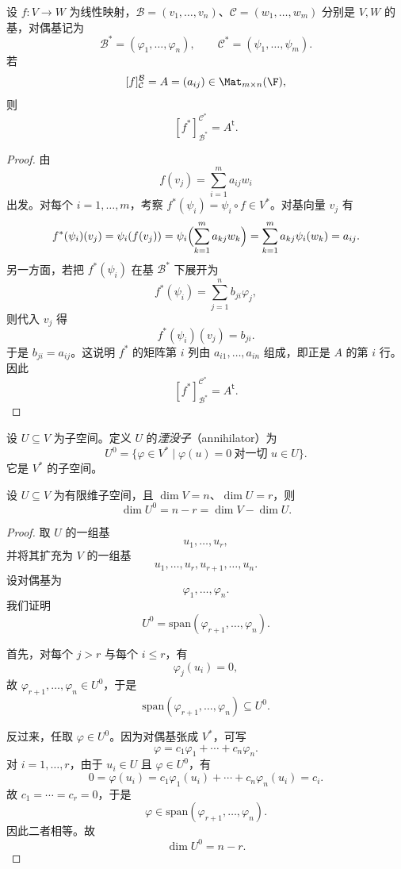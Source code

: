 \begin{theorem}
设 $f\colon V\to W$ 为线性映射，$\mathcal B=(v_1,\dots,v_n)$、$\mathcal C=(w_1,\dots,w_m)$ 分别是 $V,W$ 的基，对偶基记为
\[
  \mathcal B^*=(\varphi_1,\dots,\varphi_n),
  \qquad
  \mathcal C^*=(\psi_1,\dots,\psi_m).
\]
若
\[
  [f]_{\mathcal C}^{\mathcal B}=A=(a_{ij})\in \Mat_{m\times n}(\F),
\]
则
\[
  [f^*]_{\mathcal B^*}^{\mathcal C^*}=A^\mathsf{t}.
\]
\end{theorem}

\begin{proof}
由
\[
  f(v_j)=\sum_{i=1}^m a_{ij}w_i
\]
出发。对每个 $i=1,\dots,m$，考察 $f^*(\psi_i)=\psi_i\circ f\in V^*$。对基向量 $v_j$ 有
\[
  f^*(\psi_i)(v_j)=\psi_i(f(v_j))
  =\psi_i\Bigl(\sum_{k=1}^m a_{kj}w_k\Bigr)
  =\sum_{k=1}^m a_{kj}\psi_i(w_k)
  =a_{ij}.
\]
另一方面，若把 $f^*(\psi_i)$ 在基 $\mathcal B^*$ 下展开为
\[
  f^*(\psi_i)=\sum_{j=1}^n b_{ji}\varphi_j,
\]
则代入 $v_j$ 得
\[
  f^*(\psi_i)(v_j)=b_{ji}.
\]
于是 $b_{ji}=a_{ij}$。这说明 $f^*$ 的矩阵第 $i$ 列由 $a_{i1},\dots,a_{in}$ 组成，即正是 $A$ 的第 $i$ 行。因此
\[
  [f^*]_{\mathcal B^*}^{\mathcal C^*}=A^\mathsf{t}.
\]
\end{proof}

\begin{center}
\end{center}

\begin{definition}
设 $U\subseteq V$ 为子空间。定义 $U$ 的\emph{湮没子}（annihilator）为
\[
  U^0=\{\varphi\in V^*\mid \varphi(u)=0\ \text{对一切 }u\in U\}.
\]
它是 $V^*$ 的子空间。
\end{definition}

\begin{proposition}
设 $U\subseteq V$ 为有限维子空间，且 $\dim V=n$、$\dim U=r$，则
\[
  \dim U^0=n-r=\dim V-\dim U.
\]
\end{proposition}

\begin{proof}
取 $U$ 的一组基
\[
  u_1,\dots,u_r,
\]
并将其扩充为 $V$ 的一组基
\[
  u_1,\dots,u_r,u_{r+1},\dots,u_n.
\]
设对偶基为
\[
  \varphi_1,\dots,\varphi_n.
\]
我们证明
\[
  U^0=\mathrm{span}(\varphi_{r+1},\dots,\varphi_n).
\]

首先，对每个 $j>r$ 与每个 $i\le r$，有
\[
  \varphi_j(u_i)=0,
\]
故 $\varphi_{r+1},\dots,\varphi_n\in U^0$，于是
\[
  \mathrm{span}(\varphi_{r+1},\dots,\varphi_n)\subseteq U^0.
\]

反过来，任取 $\varphi\in U^0$。因为对偶基张成 $V^*$，可写
\[
  \varphi=c_1\varphi_1+\cdots+c_n\varphi_n.
\]
对 $i=1,\dots,r$，由于 $u_i\in U$ 且 $\varphi\in U^0$，有
\[
  0=\varphi(u_i)=c_1\varphi_1(u_i)+\cdots+c_n\varphi_n(u_i)=c_i.
\]
故 $c_1=\cdots=c_r=0$，于是
\[
  \varphi\in\mathrm{span}(\varphi_{r+1},\dots,\varphi_n).
\]
因此二者相等。故
\[
  \dim U^0=n-r.
\]
\end{proof}

